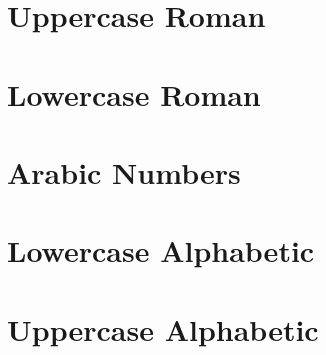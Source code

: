 \documentclass{article}
\begin{document}
	
	\tableofcontents
	\newpage
	
	\section{Uppercase Roman}
	\blindtext[1]
	
	\newpage
	\section{Lowercase Roman}
	\blindtext[1]
	
	\newpage
	\section{Arabic Numbers}
	\blindtext[1]
	
	\newpage
	\section{Lowercase Alphabetic}
	\blindtext[1]
	
	\newpage
	\section{Uppercase Alphabetic}
	\blindtext[1]
	
\end{document}
